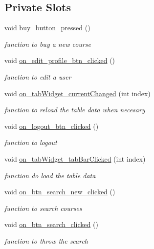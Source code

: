 \subsection*{Private Slots}
\begin{DoxyCompactItemize}
\item 
void \hyperlink{classclientPage_a4e6a1fa2748827eeebac3ec6ec8ca2b9}{buy\+\_\+button\+\_\+pressed} ()
\begin{DoxyCompactList}\small\item\em function to buy a new course \end{DoxyCompactList}\item 
void \hyperlink{classclientPage_a71689a732ff9823c892105996593084b}{on\+\_\+edit\+\_\+profile\+\_\+btn\+\_\+clicked} ()
\begin{DoxyCompactList}\small\item\em function to edit a user \end{DoxyCompactList}\item 
void \hyperlink{classclientPage_a8485bac1ad742c7fe4bb4b14a504b506}{on\+\_\+tab\+Widget\+\_\+current\+Changed} (int index)
\begin{DoxyCompactList}\small\item\em function to reload the table data when necesary \end{DoxyCompactList}\item 
void \hyperlink{classclientPage_aaa4bc6d404c46a5d066fd566e902f5d9}{on\+\_\+logout\+\_\+btn\+\_\+clicked} ()
\begin{DoxyCompactList}\small\item\em function to logout \end{DoxyCompactList}\item 
void \hyperlink{classclientPage_a48bd84cbd67d5fad6a221b400c3e95e7}{on\+\_\+tab\+Widget\+\_\+tab\+Bar\+Clicked} (int index)
\begin{DoxyCompactList}\small\item\em function do load the table data \end{DoxyCompactList}\item 
void \hyperlink{classclientPage_ab2b6ddcf0b2a65919802226ac692cab9}{on\+\_\+btn\+\_\+search\+\_\+new\+\_\+clicked} ()
\begin{DoxyCompactList}\small\item\em function to search courses \end{DoxyCompactList}\item 
void \hyperlink{classclientPage_aba1c12dd43662d34b989a250af96c0aa}{on\+\_\+btn\+\_\+search\+\_\+clicked} ()
\begin{DoxyCompactList}\small\item\em function to throw the search \end{DoxyCompactList}\end{DoxyCompactItemize}
